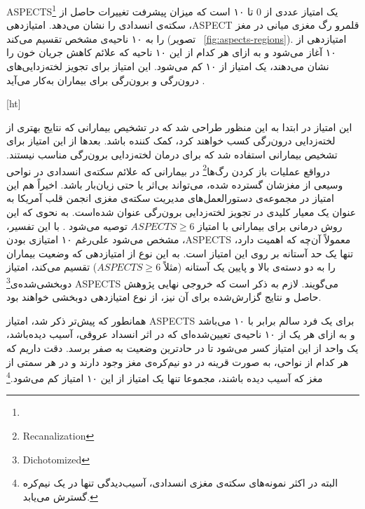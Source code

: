 
ASPECTS\footnote{}
یک امتیاز عددی از 0 تا ۱۰ است که میزان پیشرفت تغییرات حاصل از سکته‌ی انسدادی را 
نشان می‌دهد.
 امتیاز‌دهی ،ASPECT 
 قلمرو رگ مغزی میانی در مغز را به ۱۰ ناحیه‌ی مشخص تقسیم می‌کند (تصویر ~\ref{fig:aspects-regions}).
 امتیازدهی  از ۱۰ آغاز می‌شود و به ازای هر کدام از این ۱۰ ناحیه که علائم کاهش جریان 
 خون را نشان می‌دهند، یک امتیاز از ۱۰ کم می‌شود.
 این امتیاز برای تجویز لخته‌زدایی‌های درون‌رگی و برون‌رگی برای بیماران به‌کار می‌آید \cite{mokin2017aspects}.



[ht]

این امتیاز 
در ابتدا به این منظور طراحی شد که 
در تشخیص بیمارانی که نتایج بهتری از لخته‌زدایی درون‌رگی
کسب خواهند کرد،‌ کمک کننده باشد.
بعد‌ها از این امتیاز برای تشخیص بیمارانی استفاده شد که برای درمان لخته‌زدایی برون‌رگی مناسب نیستند.
درواقع عملیات 
باز کردن رگ‌ها\footnote{Recanalization}
در بیمارانی که علائم سکته‌ی انسدادی در نواحی وسیعی از مغزشان گسترده شده، می‌تواند بی‌اثر یا حتی زیان‌بار باشد.
اخیراً هم این امتیاز در
مجموعه‌ی دستور‌العمل‌های مدیریت سکته‌ی مغزی
انجمن قلب آمریکا به عنوان 
 یک معیار کلیدی در تجویز 
 لخته‌زدایی برون‌رگی عنوان شده‌است.
 به نحوی که این روش درمانی برای بیمارانی با امتیاز $ASPECTS\geq 6$ توصیه می‌شود \cite{mokin2017aspects}.
با این تفسیر، مشخص می‌شود علی‌رغم ۱۰ امتیازی بودن ،ASPECTS معمولاً آن‌چه که اهمیت دارد، تنها یک حد آستانه بر روی این امتیاز است.
به این نوع از امتیازدهی که وضعیت بیماران را به دو دسته‌ی بالا و پایین یک آستانه (مثلاً $ASPECTS\geq6$) تقسیم می‌کند، امتیاز 
دوبخشی‌شده‌ی\footnote{Dichotomized}
ASPECTS می‌گویند.
لازم به ذکر است که خروجی نهایی پژوهش حاصل و نتایج گزارش‌شده برای آن نیز، از نوع امتیازدهی دو‌بخشی خواهند بود.


همانطور که پیش‌تر ذکر شد، امتیاز ASPECTS برای یک فرد سالم برابر با ۱۰ می‌باشد و به ازای هر یک از ۱۰ ناحیه‌ی تعیین‌شده‌ای که در اثر انسداد عروقی، آسیب دیده‌باشد، یک واحد از این امتیاز کسر می‌شود تا در حادترین وضعیت به صفر برسد.
دقت داریم که هر کدام از نواحی، به صورت قرینه در دو نیم‌کره‌ی مغز وجود دارند و در هر سمتی از مغز که آسیب دیده باشند، مجموعا تنها یک امتیاز از این ۱۰ امتیاز کم می‌شود.\footnote{البته در اکثر نمونه‌های سکته‌ی مغزی انسدادی، آسیب‌دیدگی تنها در یک نیم‌کره گسترش می‌یابد.}

